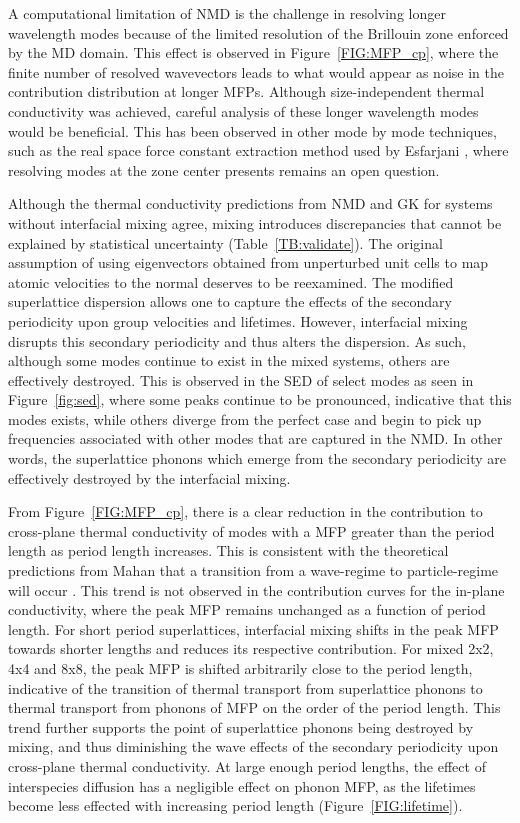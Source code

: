 A computational limitation of NMD is the challenge in resolving longer wavelength modes because of the limited resolution of the Brillouin zone enforced by the MD domain. This effect is observed in Figure~\ref{FIG:MFP_cp}, where the finite number of resolved wavevectors leads to what would appear as noise in the contribution distribution at longer MFPs. Although size-independent thermal conductivity was achieved, careful analysis of these longer wavelength modes would be beneficial. This has been observed in other mode by mode techniques, such as the real space force constant extraction method used by Esfarjani \cite{PhysRevB.84.085204}, where resolving modes at the zone center presents remains an open question.

Although the thermal conductivity predictions from NMD and GK for systems without interfacial mixing agree, mixing introduces discrepancies that cannot be explained by statistical uncertainty (Table~\ref{TB:validate}). The original assumption of using eigenvectors obtained from unperturbed unit cells to map atomic velocities to the normal deserves to be reexamined. The modified superlattice dispersion allows one to capture the effects of the secondary periodicity upon group velocities and lifetimes. However, interfacial mixing disrupts this secondary periodicity and thus alters the dispersion. As such, although some modes continue to exist in the mixed systems, others are effectively destroyed. This is observed in the SED of select modes as seen in Figure~\ref{fig:sed}, where some peaks continue to be pronounced, indicative that this modes exists, while others diverge from the perfect case and begin to pick up frequencies associated with other modes that are captured in the NMD.  In other words, the superlattice phonons which emerge from the secondary periodicity are effectively destroyed by the interfacial mixing. 

From Figure~\ref{FIG:MFP_cp}, there is a clear reduction in the contribution to cross-plane thermal conductivity of modes with a MFP greater than the period length as period length increases. This is consistent with the theoretical predictions from Mahan that a transition from a wave-regime to particle-regime will occur \cite{PhysRevLett.84.927,PhysRevB.56.10754}. This trend is not observed in the contribution curves for the in-plane conductivity, where the peak MFP remains unchanged as a function of period length. For short period superlattices, interfacial mixing shifts in the peak MFP towards shorter lengths and reduces its respective contribution. For mixed 2x2, 4x4 and 8x8, the peak MFP is shifted arbitrarily close to the period length, indicative of the transition of thermal transport from superlattice phonons to thermal transport from phonons of MFP on the order of the period length. This trend further supports the point of superlattice phonons being destroyed by mixing, and thus diminishing the wave effects of the secondary periodicity upon cross-plane thermal conductivity. At large enough period lengths, the effect of interspecies diffusion has a negligible effect on phonon MFP, as the lifetimes become less effected with increasing period length (Figure~\ref{FIG:lifetime}). 


